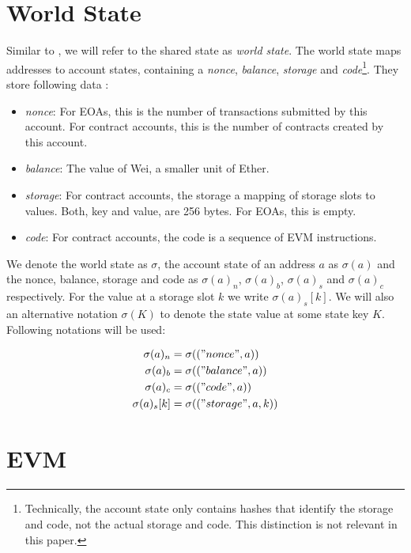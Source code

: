 \documentclass[draft,final]{vutinfth} %
\begin{document}
\section{World State}

Similar to \cite{wood_ethereum_2024}, we will refer to the shared state as \emph{world state}. The world state maps addresses to account states, containing a \emph{nonce}, \emph{balance}, \emph{storage} and \emph{code}\footnote{Technically, the account state only contains hashes that identify the storage and code, not the actual storage and code. This distinction is not relevant in this paper.}. They store following data \cite{wood_ethereum_2024}:

\begin{itemize}
    \item \emph{nonce}: For EOAs, this is the number of transactions submitted by this account. For contract accounts, this is the number of contracts created by this account.
    \item \emph{balance}: The value of Wei, a smaller unit of Ether.
    \item \emph{storage}: For contract accounts, the storage a mapping of storage slots to values. Both, key and value, are 256 bytes. For EOAs, this is empty.
    \item \emph{code}: For contract accounts, the code is a sequence of EVM instructions.
\end{itemize}

We denote the world state as $\sigma$, the account state of an address $a$ as $\sigma(a)$ and the nonce, balance, storage and code as $\sigma(a)_n$, $\sigma(a)_b$, $\sigma(a)_s$ and $\sigma(a)_c$ respectively. For the value at a storage slot $k$ we write $\sigma(a)_s[k]$. We will also an alternative notation $\sigma(K)$ to denote the state value at some state key $K$. Following notations will be used:

\begin{align*}
    \sigma(a)_n    & = \sigma(("nonce", a))      \\
    \sigma(a)_b    & = \sigma(("balance", a))    \\
    \sigma(a)_c    & = \sigma(("code", a))       \\
    \sigma(a)_s[k] & = \sigma(("storage", a, k)) \\
\end{align*}

\section{EVM}
\end{document}
